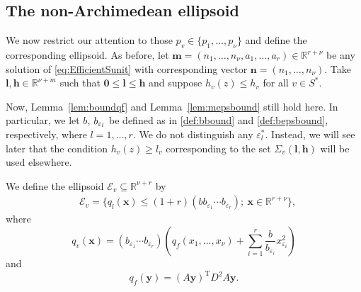 \subsection{The non-Archimedean ellipsoid}
\label{subsec:nonArchEllipsoid}

We now restrict our attention to those $p_v \in \{p_1, \dots, p_{\nu}\}$ and define the corresponding ellipsoid. As before, let $\mathbf{m} = (n_1, \dots, n_{\nu}, a_1, \dots, a_r) \in \mathbb{R}^{r + \nu}$ be any solution of \eqref{eq:EfficientSunit} with corresponding vector $\mathbf{n} = (n_1, \dots, n_{\nu})$. Take $\mathbf{l},\mathbf{h}\in\mathbb{R}^{\nu+m}$ such that $\mathbf{0} \leq \mathbf{l} \leq \mathbf{h}$ and suppose $h_v(z)\leq h_v$ for all $v\in S^*$. 

Now, Lemma~\ref{lem:boundqf} and Lemma~\ref{lem:mepsbound} still hold here. In particular, we let $b$, $b_{\varepsilon_l}$ be defined as in \eqref{def:bbound} and \eqref{def:bepsbound}, respectively, where $l = 1, \dots, r$. We do not distinguish any $\varepsilon_l^*$. Instead, we will see later that the condition $h_{v}(z) \geq l_{v}$ corresponding to the set $\Sigma_v(\mathbf{l}, \mathbf{h})$ will be used elsewhere. 

We define the ellipsoid $\mathcal{E}_v \subseteq \mathbb{R}^{\nu + r}$ by 
\begin{align}\label{def:ellp}
& \mathcal{E}_v=\{q_l(\mathbf{x})\leq (1 + r)(bb_{\varepsilon_1}\cdots b_{\varepsilon_r}); \ \mathbf{x}\in\mathbb{R}^{r+\nu}\},\end{align}
where
\[q_v(\mathbf{x})= (b_{\varepsilon_1}\cdots b_{\varepsilon_r})\left( q_f(x_1, \dots, x_{\nu}) + \sum_{i = 1}^r\frac{b}{b_{\varepsilon_i}}x_{\varepsilon_i}^2\right)\]
and
\[q_f(\mathbf{y}) = (A\mathbf{y})^{\text{T}}D^2A\mathbf{y}.\]

